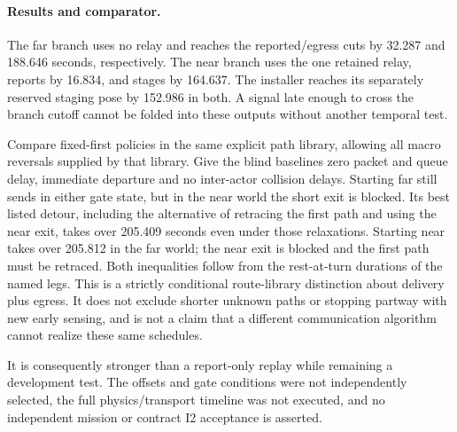 \documentclass{article}
\begin{document}
\paragraph{Results and comparator.}
The far branch uses no relay and reaches the reported/egress
cuts by 32.287 and 188.646 seconds, respectively. The near
branch uses the one retained relay, reports by 16.834,
and stages by 164.637. The installer reaches its separately
reserved staging pose by 152.986 in both. A signal late
enough to cross the branch cutoff cannot be folded into
these outputs without another temporal test.

Compare fixed-first policies in the same explicit path
library, allowing all macro reversals supplied by that
library. Give the blind baselines zero packet and queue
delay, immediate departure and no inter-actor collision
delays. Starting far still sends in either gate state, but
in the near world the short exit is blocked. Its best
listed detour, including the alternative of retracing the
first path and using the near exit, takes over 205.409
seconds even under those relaxations. Starting near takes
over 205.812 in the far world; the near exit is blocked and
the first path must be retraced. Both inequalities follow
from the rest-at-turn durations of the named legs. This is
a strictly conditional route-library distinction about
delivery plus egress. It does not exclude shorter unknown
paths or stopping partway with new early sensing, and is
not a claim that a different communication algorithm
cannot realize these same schedules.

It is consequently stronger than a report-only replay
while remaining a development test. The offsets and gate
conditions were not independently selected, the full
physics/transport timeline was not executed, and no
independent mission or contract I2 acceptance is asserted.
\end{document}

